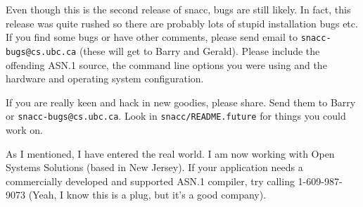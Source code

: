 Even though this is the second release of snacc, bugs are still
likely.  In fact, this release was quite rushed so there are probably
lots of stupid installation bugs etc.  If you find some bugs or have
other comments, please send email to \verb$snacc-bugs@cs.ubc.ca$
(these will get to Barry and Gerald).  Please include the offending
ASN.1 source, the command line options you were using and the hardware
and operating system configuration.

If you are really keen and hack in new goodies, please share.  Send
them to Barry or \verb$snacc-bugs@cs.ubc.ca$. Look in
\verb$snacc/README.future$ for things you could work on.

As I mentioned, I have entered the real world. I am now working with
Open Systems Solutions (based in New Jersey).  If your application
needs a commercially developed and supported ASN.1 compiler, try
calling 1-609-987-9073 (Yeah, I know this is a plug, but it's a good
company).
